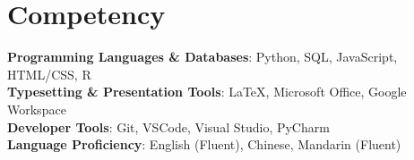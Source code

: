 \documentclass[letterpaper,11pt]{article}
\begin{document}
%
\section{Competency}
 \begin{itemize}[leftmargin=0.15in, label={}]
    \small{\item{
     \textbf{Programming Languages \& Databases}{: Python, SQL, JavaScript, HTML/CSS, R} \\
     \textbf{Typesetting \& Presentation Tools}{: LaTeX, Microsoft Office, Google Workspace} \\
     \textbf{Developer Tools}{: Git, VSCode, Visual Studio, PyCharm} \\
     \textbf{Language Proficiency}{: English (Fluent), Chinese, Mandarin (Fluent)}
    }}
 \end{itemize}


\end{document}

